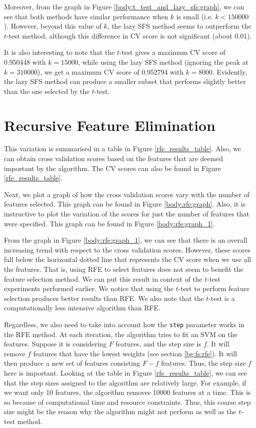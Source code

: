 \documentclass[12pt, twoside, a4paper]{report}
\begin{document}
Moreover, from the graph in Figure \ref{body:t_test_and_lazy_sfs:graph}, we can see that both methods have similar performance when $k$ is small (i.e. $k<150000$). However, beyond this value of $k$, the lazy SFS method seems to outperform the $t$-test method, although this difference in CV score is not significant (about 0.01).

It is also interesting to note that the $t$-test gives a maximum CV score of 0.950448 with $k=15000$, while using the lazy SFS method (ignoring the peak at $k=310000$), we get a maximum CV score of 0.952794 with $k=8000$. Evidently, the lazy SFS method can produce a smaller subset that performs slightly better than the one selected by the $t$-test.


\section{Recursive Feature Elimination}

This variation is summarised in a table in Figure \ref{rfe_results_table}. Also, we can obtain cross validation scores based on the features that are deemed important by the algorithm. The CV scores can also be found in Figure \ref{rfe_results_table}.

Next, we plot a graph of how the cross validation scores vary with the number of features selected. This graph can be found in Figure \ref{body:rfe:graph}. Also, it is instructive to plot the variation of the scores for just the number of features that were specified. This graph can be found in Figure \ref{body:rfe:graph_1}.

From the graph in Figure \ref{body:rfe:graph_1}, we can see that there is an overall increasing trend with respect to the cross validation scores. However, these scores fall below the horizontal dotted line that represents the CV score when we use all the features. That is, using RFE to select features does not seem to benefit the feature selection method. We can put this result in context of the $t$-test experiments performed earlier. We notice that using the $t$-test to perform feature selection produces better results than RFE. We also note that the $t$-test is a computationally less intensive algorithm than RFE.

Regardless, we also need to take into account how the \texttt{step} parameter works in the RFE method. At each iteration, the algorithm tries to fit an SVM on the features. Suppose it is considering $F$ features, and the step size is $f$. It will remove $f$ features that have the lowest weights (see section \ref{bg:fs:rfe}). It will then produce a new set of features consisting $F-f$ features. Thus, the step size $f$ here is important. Looking at the table in Figure \ref{rfe_results_table}, we can see that the step sizes assigned to the algorithm are relatively large. For example, if we want only 10 features, the algorithm removes 10000 features at a time. This is so because of computational time and resource constraints. Thus, this coarse step size might be the reason why the algorithm might not perform as well as the $t$-test method.
\end{document}
